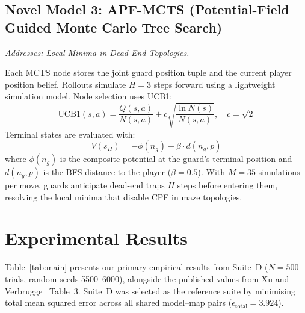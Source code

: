 \documentclass[conference,onecolumn]{IEEEtran}
\begin{document}
\subsection{Novel Model 3: APF-MCTS
            (Potential-Field Guided Monte Carlo Tree Search)}
\emph{Addresses: Local Minima in Dead-End Topologies.}

Each MCTS node stores the joint guard position tuple and the
current player position belief. Rollouts simulate $H = 3$ steps
forward using a lightweight simulation model. Node selection uses
UCB1:
\begin{equation}
  \text{UCB1}(s,a) = \frac{Q(s,a)}{N(s,a)}
  + c\sqrt{\frac{\ln N(s)}{N(s,a)}}, \quad c = \sqrt{2}
\end{equation}
Terminal states are evaluated with:
\begin{equation}
  V(s_H) = -\phi(n_g) - \beta \cdot d(n_g, p)
\end{equation}
where $\phi(n_g)$ is the composite potential at the guard's
terminal position and $d(n_g, p)$ is the BFS distance to the
player ($\beta = 0.5$). With $M = 35$ simulations per move, guards
anticipate dead-end traps $H$ steps before entering them, resolving
the local minima that disable CPF in maze topologies.

\section{Experimental Results}

Table~\ref{tab:main} presents our primary empirical results from
Suite~D ($N{=}500$ trials, random seeds 5500--6000), alongside the
published values from Xu and Verbrugge~\cite{xu2025} Table~3.
Suite~D was selected as the reference suite by minimising total
mean squared error across all shared model--map pairs
($\epsilon_{\text{total}} = 3.924$).
\end{document}
